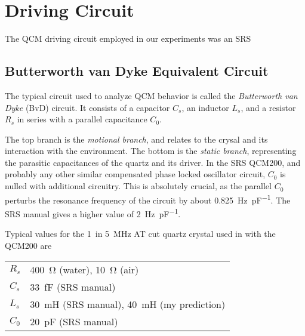 \section{Driving Circuit}
The QCM driving circuit employed in our experiments was an SRS
\subsection{Butterworth van Dyke Equivalent Circuit}
The typical circuit used to analyze QCM behavior is called the
\textit{Butterworth van Dyke} (BvD) circuit.  It consists of a capacitor
$C_s$, an inductor $L_s$, and a resistor $R_s$ in series with a parallel
capacitance $C_0$.
\begin{center}
\end{center}

\begin{center}
\end{center}



The top branch is the \textit{motional branch}, and relates to the crysal
and its interaction with the environment.  The bottom is the \textit{static
branch}, representing the parasitic capacitances of the quartz and its driver.
In the SRS QCM200\cite{srsqcmmanual}, and probably any other similar
compensated phase locked oscillator circuit, $C_0$ is nulled with
additional circuitry.  This is absolutely crucial, as the parallel $C_0$
perturbs the resonance frequency of the circuit by about
\SI{0.825}{\hertz\per\pico\farad}.  The SRS manual gives a higher value
of \SI{2}{\hertz\per\pico\farad}.

Typical values for the \SI{1}{in} \SI{5}{\mega\hertz} AT cut quartz
crystal used in with the QCM200\cite{srsqcmmanual} are

\begin{table}[h]
\begin{tabular}{ll}
 $R_s$ & \SI{400}{\ohm} (water), \SI{10}{\ohm} (air) \\
 $C_s$ & \SI{33}{\femto\farad} (SRS manual)\\
 $L_s$ & \SI{30}{\milli\henry} (SRS manual), \SI{40}{\milli\henry} (my prediction) \\
 $C_0$ & \SI{20}{\pico\farad} (SRS manual)
\end{tabular}
\end{table}

